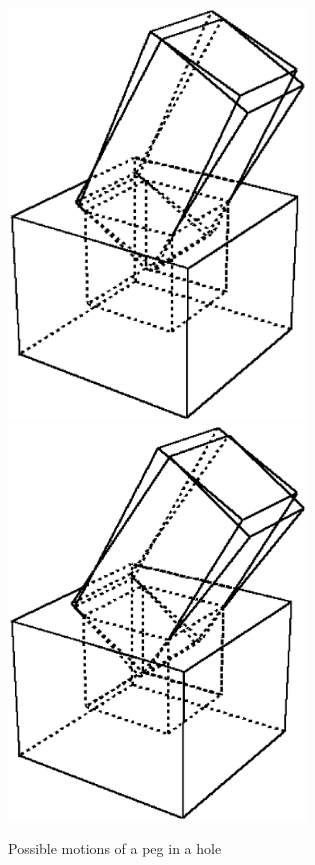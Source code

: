 \begin{figure}[h]
\begin{center}
\includegraphics[width=7.9cm]{fig/fig-peg-naname-m3.ps}
\includegraphics[width=7.9cm]{fig/fig-peg-naname-m4.ps}
\end{center}
\caption{Possible motions of a peg in a hole}
\label{fig:peg-in-a-hole}
\end{figure}

\clearpage
